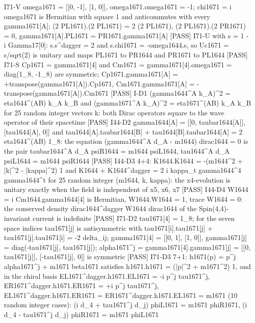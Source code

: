 \documentclass[
  10pt,
]{article}
\newenvironment{Shaded}{}{}
\newcommand{\NormalTok}[1]{#1}
\begin{document}
\begin{Shaded}
\begin{Highlighting}[]
\NormalTok{[PASS] I71{-}V   omega1671 = [[0, {-}1], [1, 0]], omega1671.omega1671 = {-}1; chi1671 = i omega1671 is Hermitian with square 1 and anticommutes with every gamma1671[A]; (2 PL1671).(2 PL1671) = 2 (2 PL1671), (2 PL1671).(2 PR1671) = 0, gamma1671[A].PL1671 = PR1671.gamma1671[A]}
\NormalTok{[PASS] I71{-}U   with s = 1 {-} i Gamma17[0]: s.s\^{}dagger = 2 and s.chi1671 = {-}omega1644.s, so Uc1671 = s/sqrt(2) is unitary and maps PL1671 to PR1644 and PR1671 to PL1644}
\NormalTok{[PASS] I71{-}S   Cp1671 = gamma1671[4] and Cm1671 = gamma1671[4].omega1671 = diag(1\_8, {-}1\_8) are symmetric; Cp1671.gamma1671[A] = +transpose(gamma1671[A]).Cp1671, Cm1671.gamma1671[A] = {-}transpose(gamma1671[A]).Cm1671}
\NormalTok{[PASS] I{-}D1    (gamma1644\^{}A k\_A)\^{}2 = eta1644\^{}(AB) k\_A k\_B and (gamma1671\^{}A k\_A)\^{}2 = eta1671\^{}(AB) k\_A k\_B for 25 random integer vectors k: both Dirac operators square to the wave operator of their spacetime}
\NormalTok{[PASS] I44{-}D2  gamma1644[A] = [[0, taubar1644[A]], [tau1644[A], 0]] and tau1644[A].taubar1644[B] + tau1644[B].taubar1644[A] = 2 eta1644\^{}(AB) 1\_8: the equation (gamma1644\^{}A d\_A {-} m1644) dirac1644 = 0 is the pair taubar1644\^{}A d\_A psiR1644 = m1644 psiL1644, tau1644\^{}A d\_A psiL1644 = m1644 psiR1644}
\NormalTok{[PASS] I44{-}D3  4+4: K1644.K1644 = {-}(m1644\^{}2 + |k|\^{}2 {-} |kappa|\^{}2) 1 and K1644 + K1644\^{}dagger = 2 i kappa\_t gamma1644\^{}4 gamma1644\^{}t for 25 random integer (m1644, k, kappa): the x4{-}evolution is unitary exactly when the field is independent of x5, x6, x7}
\NormalTok{[PASS] I44{-}D4  W1644 = i Cm1644.gamma1644[4] is Hermitian, W1644.W1644 = 1, trace W1644 = 0: the conserved density dirac1644\^{}dagger W1644 dirac1644 of the Spin(4,4){-}invariant current is indefinite}
\NormalTok{[PASS] I71{-}D2  tau1671[4] = 1\_8; for the seven space indices tau1671[j] is antisymmetric with tau1671[i].tau1671[j] + tau1671[j].tau1671[i] = {-}2 delta\_ij; gamma1671[4] = [[0, 1], [1, 0]], gamma1671[j] = diag({-}tau1671[j], tau1671[j]); alpha1671\^{}j = gamma1671[4].gamma1671[j] = [[0, tau1671[j]], [{-}tau1671[j], 0]] is symmetric}
\NormalTok{[PASS] I71{-}D3  7+1: h1671(p) = p\^{}j alpha1671\^{}j + m1671 beta1671 satisfies h1671.h1671 = (|p|\^{}2 + m1671\^{}2) 1, and in the chiral basis EL1671\^{}dagger.h1671.EL1671 = {-}i p\^{}j tau1671\^{}j, ER1671\^{}dagger.h1671.ER1671 = +i p\^{}j tau1671\^{}j, EL1671\^{}dagger.h1671.ER1671 = ER1671\^{}dagger.h1671.EL1671 = m1671 (10 random integer cases): (i d\_4 + tau1671\^{}j d\_j) phiL1671 = m1671 phiR1671, (i d\_4 {-} tau1671\^{}j d\_j) phiR1671 = m1671 phiL1671}

\end{Highlighting}
\end{Shaded}
\end{document}
